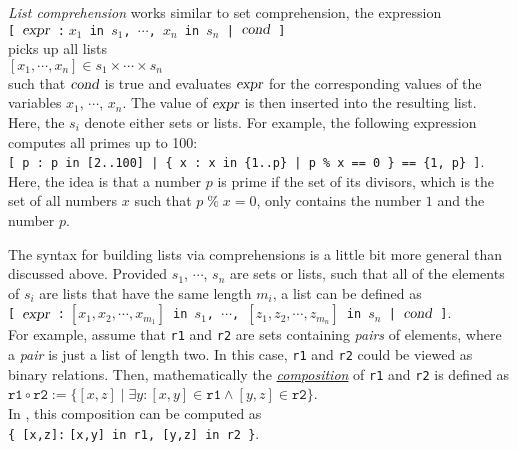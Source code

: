 \emph{List comprehension} works similar to set comprehension, the expression
\\[0.2cm]
\hspace*{1.3cm}
\texttt{[ $\textsl{expr}$ :$\;x_1$ in $s_1$, $\cdots$, $x_n$ in $s_n$ | $\textsl{cond}$ ]}
\\[0.2cm]
 picks up all lists 
\\[0.2cm]
\hspace*{1.3cm}
$[x_1, \cdots, x_n ] \in s_1 \times \cdots \times s_n$
\\[0.2cm]
such that $\textsl{cond}$ is true and evaluates $\textsl{expr}$ for the corresponding values of the
variables $x_1$, $\cdots$, $x_n$.  The value of $\textsl{expr}$ is
then inserted into the resulting list.  Here, the $s_i$ denote either sets or lists.
For example, the following expression  computes all primes up
to 100: 
\\[0.2cm]
\hspace*{1.3cm}
\texttt{[ p : p in [2..100] | \{ x : x in \{1..p\} | p \% x == 0 \} == \{1, p\} ]}.
\\[0.2cm]
Here, the idea is that a number $p$ is prime if the set of its divisors, which is the set
of all numbers $x$ such that $p \;\texttt{\%}\; x = 0$, only contains the number $1$ and
the number $p$. 

The syntax for building lists via comprehensions is a little bit more
general than discussed above.  Provided $s_1$, $\cdots$, $s_n$ are sets or lists,
such that all of the elements of $s_i$ are lists that have the same length $m_i$, a list 
can be defined as
\\[0.2cm]
\hspace*{1.3cm}
\texttt{[ $\textsl{expr}$ :$\;[x_1,x_2,\cdots,x_{m_1}]$ in $s_1$, $\cdots$, $[z_1,z_2,\cdots, z_{m_n}]$ in $s_n$ | $\textsl{cond}$ ]}.
\\[0.2cm]
For example, assume that \texttt{r1} and \texttt{r2} are sets containing \emph{pairs} of elements, where a
\emph{pair} is just a list of length two.  In this case, \texttt{r1} and \texttt{r2} could be viewed as binary
relations.  Then, mathematically the 
\href{https://en.wikipedia.org/wiki/Composition_of_relations}{\emph{composition}} of \texttt{r1} and
\texttt{r2} is defined as
\\[0.2cm]
\hspace*{1.3cm}
$\mathtt{r1} \circ \mathtt{r2} := \{ [x,z] \mid \exists y: [x,y] \in \mathtt{r1} \wedge [y,z] \in\mathtt{r2} \}$. 
\\[0.2cm]
In \setlx, this composition can be computed as 
\\[0.2cm]
\hspace*{1.3cm}
\texttt{\{ [x,z]:$\;$[x,y] in r1, [y,z] in r2 \}}.

